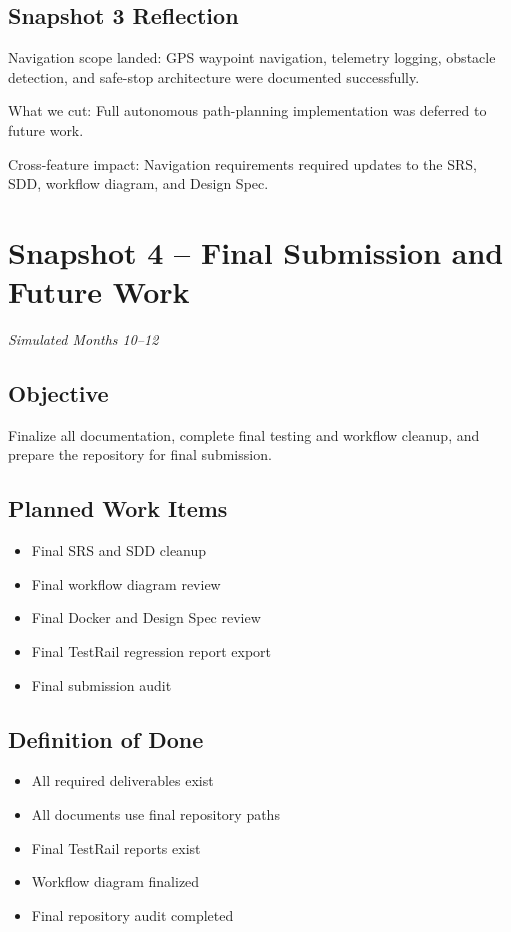 \documentclass[11pt]{article}
\begin{document}
\subsection{Snapshot 3 Reflection}

Navigation scope landed: GPS waypoint navigation, telemetry logging, obstacle detection, and safe-stop architecture were documented successfully.

What we cut: Full autonomous path-planning implementation was deferred to future work.

Cross-feature impact: Navigation requirements required updates to the SRS, SDD, workflow diagram, and Design Spec.

\section{Snapshot 4 -- Final Submission and Future Work}

\textit{Simulated Months 10--12}

\subsection{Objective}

Finalize all documentation, complete final testing and workflow cleanup, and prepare the repository for final submission.

\subsection{Planned Work Items}

\begin{itemize}[leftmargin=*]
  \item Final SRS and SDD cleanup
  \item Final workflow diagram review
  \item Final Docker and Design Spec review
  \item Final TestRail regression report export
  \item Final submission audit
\end{itemize}

\subsection{Definition of Done}

\begin{itemize}[leftmargin=*]
  \item All required deliverables exist
  \item All documents use final repository paths
  \item Final TestRail reports exist
  \item Workflow diagram finalized
  \item Final repository audit completed
\end{itemize}
\end{document}
